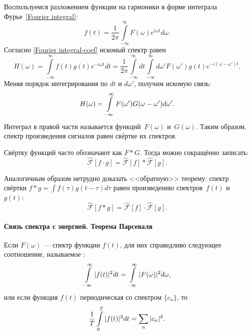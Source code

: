 Воспользуемся разложением функции на гармоники в форме
интеграла Фурье~\eqref{Fourier integral}:
\begin{equation*}
f(t) = \frac{1}{2\pi} \int\limits_{-\infty}^{\infty} F(\omega)e^{i\omega t} d\omega.
\end{equation*}
Согласно \eqref{Fourier integral-coef} искомый спектр равен
\begin{equation*}
H(\omega) = \int\limits_{-\infty}^{\infty} f(t) g(t) e^{-i\omega t} dt =
\frac{1}{2\pi} \int\limits_{-\infty}^{\infty} dt
\int\limits_{-\infty}^{\infty} d\omega' F(\omega') g(t) e^{-i(\omega-\omega')t}.
\end{equation*}
Меняя порядок интегрирования по $dt$ и $d\omega'$, получим искомую связь:
\begin{equation}
    \eqmark{folding}
H(\omega) = \int\limits_{-\infty}^{\infty} F(\omega')G(\omega-\omega') d\omega'.
\end{equation}
Интеграл в правой части называется 
функций~$F(\omega)$ и~$G(\omega)$. Таким образом, спектр произведения сигналов
равен свёртке их спектров.


Свёртку функций часто обозначают как $F * G$. Тогда можно сокращённо 
записать:
\begin{equation*}
 \hat{\mathcal{F}}[f\cdot g] = \hat{\mathcal{F}}[f] * \hat{\mathcal{F}}[g].
\end{equation*}

Аналогичным образом нетрудно доказать <<обратную>> теорему:
спектр свёртки $f*g = \int f(\tau) g(t-\tau) d\tau$ равен произведению
спектров~$f(t)$ и~$g(t)$:
\begin{equation*}
\hat{\mathcal{F}}[f*g] = \hat{\mathcal{F}}[f] \cdot \hat{\mathcal{F}}[g].
\end{equation*}

\paragraph{Связь спектра с энергией. Теорема Парсеваля}
Если $F(\omega)$ --- спектр функции $f(t)$, для них справедливо следующее
соотношение, называемое :
\begin{equation}
    \eqmark{parseval-int}
\int\limits_{-\infty}^{\infty} |f(t)|^2 dt =
\int\limits_{-\infty}^{\infty} |F(\omega)|^2 d\omega,
\end{equation}
или если функция $f(t)$ периодическая со спектром $\{c_n\}$, то
\begin{equation}
    \eqmark{parseval-dicrete}
\frac{1}{T}\int\limits_{0}^{T} |f(t)|^2 dt =
\sum\limits_n |c_n|^2.
\end{equation}

